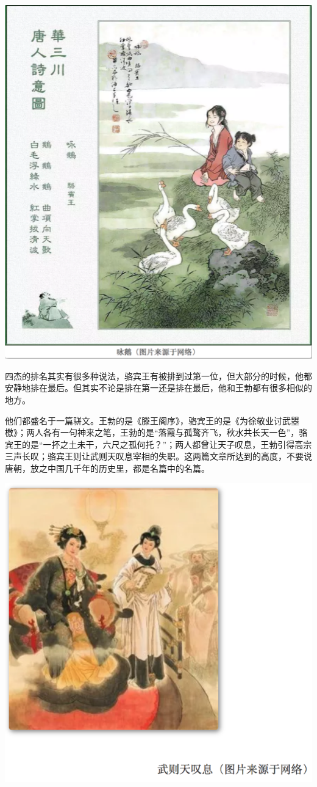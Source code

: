 \documentclass[]{book}
\begin{document}
\includegraphics[width=7.25in]{images/ctsj7}

四杰的排名其实有很多种说法，骆宾王有被排到过第一位，但大部分的时候，他都安静地排在最后。但其实不论是排在第一还是排在最后，他和王勃都有很多相似的地方。

他们都盛名于一篇骈文。王勃的是《滕王阁序》，骆宾王的是《为徐敬业讨武曌檄》；两人各有一句神来之笔，王勃的是``落霞与孤鹜齐飞，秋水共长天一色''，骆宾王的是``一抔之土未干，六尺之孤何托？''；两人都曾让天子叹息，王勃引得高宗三声长叹；骆宾王则让武则天叹息宰相的失职。这两篇文章所达到的高度，不要说唐朝，放之中国几千年的历史里，都是名篇中的名篇。

\includegraphics[width=8.33in]{images/ctsj8}
\end{document}
